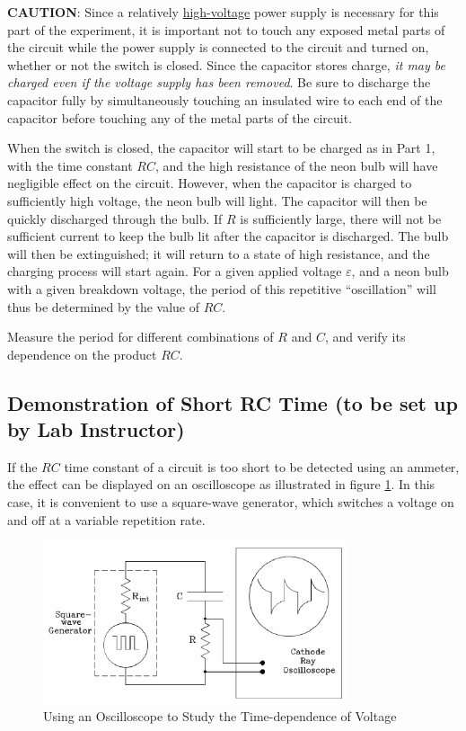 \textbf{CAUTION}: Since a relatively \underline{high-voltage} power supply is necessary for this part of the experiment, it is important not to touch any exposed metal parts of the circuit while the power supply is connected to the circuit and turned on, whether or not the switch is closed. Since the capacitor stores charge, \emph{it may be charged even if the voltage supply has been removed}. Be sure to discharge the capacitor fully by simultaneously touching an insulated wire to each end of the capacitor before touching any of the metal parts of the circuit.\myskip

When the switch is closed, the capacitor will start to be charged as in Part 1, with the time constant $RC$, and the high resistance of the neon bulb will have negligible effect on the circuit. However, when the capacitor is charged to sufficiently high voltage, the neon bulb will light. The capacitor will then be quickly discharged through the bulb. If $R$ is sufficiently large, there will not be sufficient current to keep the bulb lit after the capacitor is discharged. The bulb will then be extinguished; it will return to a state of high resistance, and the charging process will start again. For a given applied voltage $\varepsilon$, and a neon bulb with a given breakdown voltage, the period of this repetitive ``oscillation'' will thus be determined by the value of $RC$.\myskip

Measure the period for different combinations of $R$ and $C$, and verify its dependence on the product $RC$.

\subsection{Demonstration of Short RC Time (to be set up by Lab Instructor)}

If the $RC$ time constant of a circuit is too short to be detected using an ammeter, the effect can be displayed on an oscilloscope as illustrated in figure \ref{fig:capaoscil}. In this case, it is convenient to use a square-wave generator, which switches a voltage on and off at a variable repetition rate.\myskip

\begin{figure}[h]
    \begin{center}
        \includegraphics[width=0.8\textwidth]{./Exp4/pic/image9.png}
    \end{center}
    \caption{Using an Oscilloscope to Study the Time-dependence of Voltage}
    \label{fig:capaoscil}
\end{figure}

